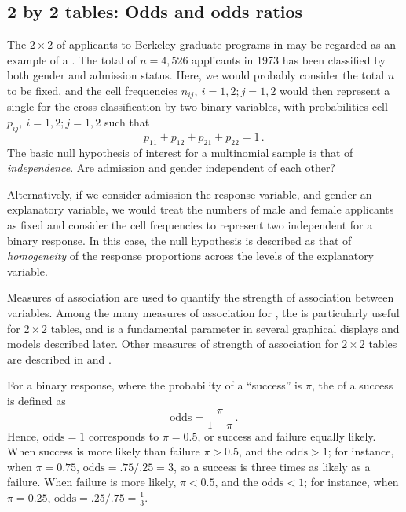 \documentclass[10pt,krantz2]{krantz}\usepackage[]{graphicx}\usepackage[]{color}
\begin{document}
\subsection{2 by 2 tables: Odds and odds ratios}\label{sec:twoway-twobytwo}

The $2 \times 2$ \ctab of applicants to Berkeley graduate programs in  may be regarded as an example of a
.
The total of $n = 4,526$ applicants in 1973 has been classified by both
gender and admission status.
Here, we would probably consider the total $n$ to be fixed,
and the cell frequencies $n_{ij},  \: i=1,2; j=1,2$
would then represent a single
 for the cross-classification by two
binary variables,
with probabilities cell $p_{ij},  \: i=1,2; j=1,2$
such that
\begin{equation*}
 p_{11} + p_{12} + p_{21} + p_{22} = 1
 \period
\end{equation*}
The basic null hypothesis of interest for a multinomial sample is that
of \emph{independence}.  Are admission and gender independent of each other?

Alternatively, if we consider admission the response variable, and
gender an explanatory variable, we would treat the numbers of male
and female applicants as fixed
and consider the cell frequencies to represent two independent
 for a binary response.
In this case, the null hypothesis is described as that of \emph{homogeneity}
of the response proportions across the levels of the explanatory variable.

Measures of association are used to quantify the strength of association
between variables.  Among the many measures of association for
\ctabs, the  is particularly useful for
$2 \times 2$ tables, and is a fundamental parameter in several
graphical displays and models described later.
Other measures of strength of association for $2 \times 2$ tables
are described in \citet[]{Stokes-etal:00} and \citet[\S 2.2]{Agresti:96}.

For a binary response, where the probability of a ``success'' is $\pi$,
the  of a success is defined as
\begin{equation*}
 \textrm{odds} = \frac{\pi}{1-\pi} \period
\end{equation*}
Hence, $\textrm{odds} = 1$ corresponds to $\pi = 0.5$, or success and
failure equally likely.   When success is more likely than failure
$\pi > 0.5$, and the $\textrm{odds} > 1$;  for instance, when $\pi = 0.75$,
$\textrm{odds} = .75/.25 =3$, so a success is three times as likely
as a failure.  When failure is more likely, $\pi < 0.5$, and the $\textrm{odds} < 1$;  for instance, when $\pi = 0.25$,
$\textrm{odds} = .25/.75 =\frac{1}{3}$.
\end{document}
